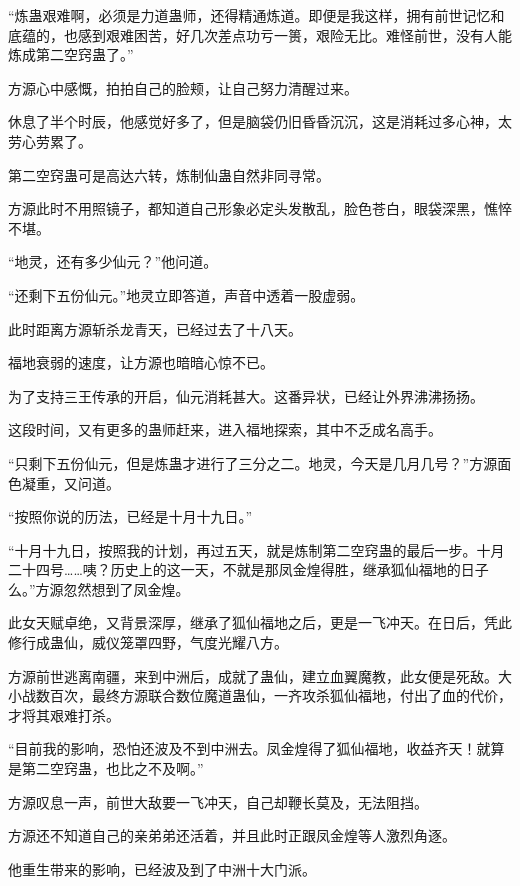\begin{this_body}
“炼蛊艰难啊，必须是力道蛊师，还得精通炼道。即便是我这样，拥有前世记忆和底蕴的，也感到艰难困苦，好几次差点功亏一篑，艰险无比。难怪前世，没有人能炼成第二空窍蛊了。”

方源心中感慨，拍拍自己的脸颊，让自己努力清醒过来。

休息了半个时辰，他感觉好多了，但是脑袋仍旧昏昏沉沉，这是消耗过多心神，太劳心劳累了。

第二空窍蛊可是高达六转，炼制仙蛊自然非同寻常。

方源此时不用照镜子，都知道自己形象必定头发散乱，脸色苍白，眼袋深黑，憔悴不堪。

“地灵，还有多少仙元？”他问道。

“还剩下五份仙元。”地灵立即答道，声音中透着一股虚弱。

此时距离方源斩杀龙青天，已经过去了十八天。

福地衰弱的速度，让方源也暗暗心惊不已。

为了支持三王传承的开启，仙元消耗甚大。这番异状，已经让外界沸沸扬扬。

这段时间，又有更多的蛊师赶来，进入福地探索，其中不乏成名高手。

“只剩下五份仙元，但是炼蛊才进行了三分之二。地灵，今天是几月几号？”方源面色凝重，又问道。

“按照你说的历法，已经是十月十九日。”

“十月十九日，按照我的计划，再过五天，就是炼制第二空窍蛊的最后一步。十月二十四号……咦？历史上的这一天，不就是那凤金煌得胜，继承狐仙福地的日子么。”方源忽然想到了凤金煌。

此女天赋卓绝，又背景深厚，继承了狐仙福地之后，更是一飞冲天。在日后，凭此修行成蛊仙，威仪笼罩四野，气度光耀八方。

方源前世逃离南疆，来到中洲后，成就了蛊仙，建立血翼魔教，此女便是死敌。大小战数百次，最终方源联合数位魔道蛊仙，一齐攻杀狐仙福地，付出了血的代价，才将其艰难打杀。

“目前我的影响，恐怕还波及不到中洲去。凤金煌得了狐仙福地，收益齐天！就算是第二空窍蛊，也比之不及啊。”

方源叹息一声，前世大敌要一飞冲天，自己却鞭长莫及，无法阻挡。

方源还不知道自己的亲弟弟还活着，并且此时正跟凤金煌等人激烈角逐。

他重生带来的影响，已经波及到了中洲十大门派。

\end{this_body}

